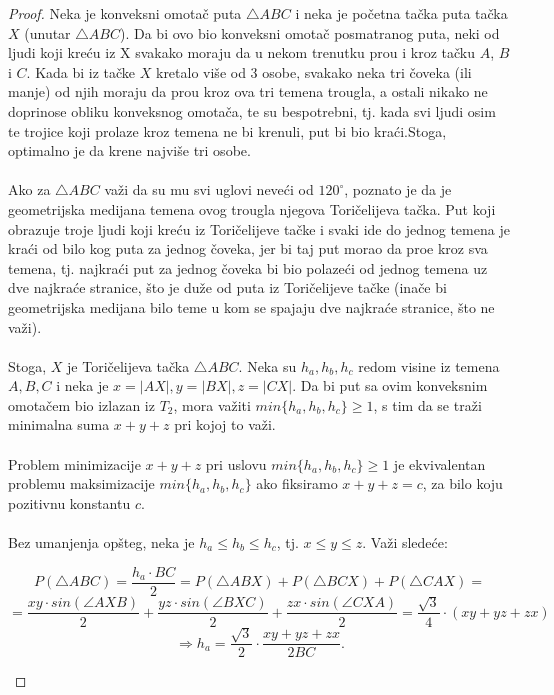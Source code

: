 \documentclass[11pt,letter]{article}
\begin{document}
\begin{proof}
Neka je konveksni omota\v c puta $\bigtriangleup ABC$ i neka je po\v cetna ta\v cka puta ta\v cka $X$ (unutar $\bigtriangleup ABC$). Da bi ovo bio konveksni omota\v c posmatranog puta, neki od ljudi koji kre\' cu iz X svakako moraju da u nekom trenutku pro\dj u i kroz ta\v cku $A$, $B$ i $C$. Kada bi iz ta\v cke $X$ kretalo vi\v se od 3 osobe, svakako neka tri \v coveka (ili manje) od njih moraju da pro\dj u kroz ova tri temena trougla, a ostali nikako ne doprinose obliku konveksnog omota\v ca, te su bespotrebni, tj. kada svi ljudi osim te trojice koji prolaze kroz temena ne bi krenuli, put bi bio kra\' ci.Stoga, optimalno je da krene najvi\v se tri osobe. 
\\
\\
\indent Ako za $\bigtriangleup ABC$ va\v zi da su mu svi uglovi neve\' ci od $120^\circ$, poznato je da je geometrijska medijana temena ovog trougla njegova Tori\v celijeva ta\v cka. Put koji obrazuje troje ljudi koji kre\' cu iz Tori\v celijeve ta\v cke i svaki ide do jednog temena je kra\' ci od bilo kog puta za jednog \v coveka, jer bi taj put morao da pro\dj e kroz sva temena, tj. najkra\' ci put za jednog \v coveka bi bio polaze\' ci od jednog temena uz dve najkra\' ce stranice, \v sto je du\v ze od puta iz Tori\v celijeve ta\v cke (ina\v ce bi geometrijska medijana bilo teme u kom se spajaju dve najkra\' ce stranice, \v sto ne va\v zi).
\\
\\
\indent Stoga, $X$ je Tori\v celijeva ta\v cka $\bigtriangleup ABC$. Neka su $h_a, h_b, h_c$ redom visine iz temena $A, B, C$ i neka je $x=|AX|, y=|BX|, z=|CX|$. Da bi put sa ovim konveksnim omota\v cem bio izlazan iz $T_2$, mora va\v ziti $min\{h_a,h_b,h_c\}\geqslant 1$, s tim da se tra\v zi minimalna suma $x+y+z$ pri kojoj to va\v zi.
\\
\\
\indent Problem minimizacije $x+y+z$ pri uslovu $min\{h_a,h_b,h_c\}\geqslant 1$ je ekvivalentan problemu maksimizacije $min\{h_a,h_b,h_c\}$ ako fiksiramo $x+y+z=c$, za bilo koju pozitivnu konstantu $c$.
\\
\\
\indent Bez umanjenja op\v steg, neka je $h_a\leqslant h_b\leqslant h_c$, tj. $x\leqslant y\leqslant z$. Va\v zi slede\' ce:
\begin{center}
$$P(\bigtriangleup ABC)=\frac{h_a\cdot BC}{2}=P(\bigtriangleup ABX)+P(\bigtriangleup BCX)+P(\bigtriangleup CAX)=$$
$$=\frac{xy\cdot sin(\angle AXB)}{2}+\frac{yz\cdot sin(\angle BXC)}{2}+\frac{zx\cdot sin(\angle CXA)}{2}=\frac{\sqrt3}{4}\cdot(xy+yz+zx)$$
$$\Longrightarrow h_a=\frac{\sqrt3}{2}\cdot \frac{xy+yz+zx}{2BC}.$$
\end{center}
\end{proof} 
\end{document}

